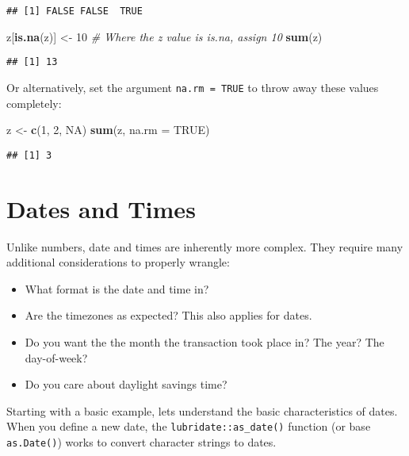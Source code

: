 \documentclass[
]{book}
\newenvironment{Shaded}{\begin{snugshade}}{\end{snugshade}}
\newcommand{\CommentTok}[1]{\textcolor[rgb]{0.56,0.35,0.01}{\textit{#1}}}
\newcommand{\DataTypeTok}[1]{\textcolor[rgb]{0.13,0.29,0.53}{#1}}
\newcommand{\DecValTok}[1]{\textcolor[rgb]{0.00,0.00,0.81}{#1}}
\newcommand{\KeywordTok}[1]{\textcolor[rgb]{0.13,0.29,0.53}{\textbf{#1}}}
\newcommand{\NormalTok}[1]{#1}
\newcommand{\OtherTok}[1]{\textcolor[rgb]{0.56,0.35,0.01}{#1}}
\newcommand{\StringTok}[1]{\textcolor[rgb]{0.31,0.60,0.02}{#1}}
\providecommand{\tightlist}{%
  \setlength{\itemsep}{0pt}\setlength{\parskip}{0pt}}
\begin{document}
\begin{verbatim}
## [1] FALSE FALSE  TRUE
\end{verbatim}

\begin{Shaded}
\begin{Highlighting}[]
\NormalTok{z[}\KeywordTok{is.na}\NormalTok{(z)] <-}\StringTok{ }\DecValTok{10} \CommentTok{# Where the z value is is.na, assign 10}
\KeywordTok{sum}\NormalTok{(z)}
\end{Highlighting}
\end{Shaded}

\begin{verbatim}
## [1] 13
\end{verbatim}

Or alternatively, set the argument \texttt{na.rm\ =\ TRUE} to throw away these values completely:

\begin{Shaded}
\begin{Highlighting}[]
\NormalTok{z <-}\StringTok{ }\KeywordTok{c}\NormalTok{(}\DecValTok{1}\NormalTok{, }\DecValTok{2}\NormalTok{, }\OtherTok{NA}\NormalTok{)}
\KeywordTok{sum}\NormalTok{(z, }\DataTypeTok{na.rm =} \OtherTok{TRUE}\NormalTok{)}
\end{Highlighting}
\end{Shaded}

\begin{verbatim}
## [1] 3
\end{verbatim}

\hypertarget{dates-and-times}{%
\section{Dates and Times}\label{dates-and-times}}

Unlike numbers, date and times are inherently more complex. They require many additional considerations to properly wrangle:

\begin{itemize}
\tightlist
\item
  What format is the date and time in?
\item
  Are the timezones as expected? This also applies for dates.
\item
  Do you want the the month the transaction took place in? The year? The day-of-week?
\item
  Do you care about daylight savings time?
\end{itemize}

Starting with a basic example, lets understand the basic characteristics of dates. When you define a new date, the \texttt{lubridate::as\_date()} function (or base \texttt{as.Date()}) works to convert character strings to dates.
\end{document}
